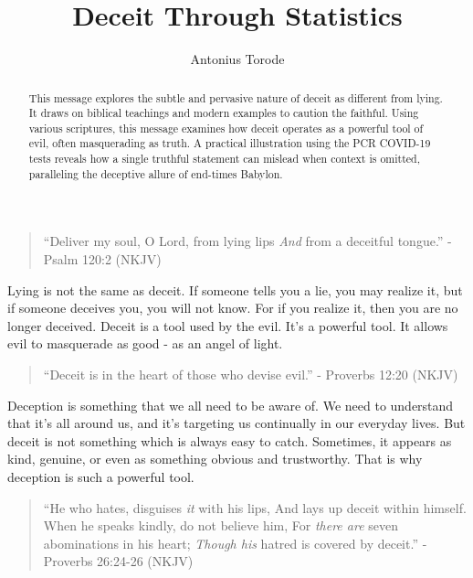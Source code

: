 \documentclass[10pt]{article}
\title{Deceit Through Statistics}
\author{Antonius Torode}
\begin{document}
\maketitle
\thispagestyle{fancy}


\begin{abstract}
This message explores the subtle and pervasive nature of deceit as different from lying. It draws on biblical teachings and modern examples to caution the faithful. Using various scriptures, this message examines how deceit operates as a powerful tool of evil, often masquerading as truth. A practical illustration using the PCR COVID-19 tests reveals how a single truthful statement can mislead when context is omitted, paralleling the deceptive allure of end-times Babylon.
\end{abstract}

\begin{multicols}{2}


\begin{quotation}
``Deliver my soul, O Lord, from lying lips \textit{And} from a deceitful tongue.'' - Psalm 120:2 (NKJV)
\end{quotation}

Lying is not the same as deceit. If someone tells you a lie, you may realize it, but if someone deceives you, you will not know. For if you realize it, then you are no longer deceived. Deceit is a tool used by the evil. It's a powerful tool. It allows evil to masquerade as good - as an angel of light. 

\begin{quotation}
``Deceit is in the heart of those who devise evil.'' - Proverbs 12:20 (NKJV)
\end{quotation}

Deception is something that we all need to be aware of. We need to understand that it's all around us, and it's targeting us continually in our everyday lives. But deceit is not something which is always easy to catch. Sometimes, it appears as kind, genuine, or even as something obvious and trustworthy. That is why deception is such a powerful tool.  

\begin{quotation}
``He who hates, disguises \textit{it} with his lips, And lays up deceit within himself. When he speaks kindly, do not believe him, For \textit{there are} seven abominations in his heart; \textit{Though his} hatred is covered by deceit.'' - Proverbs 26:24-26 (NKJV)
\end{quotation}


\end{multicols}
\end{document}
